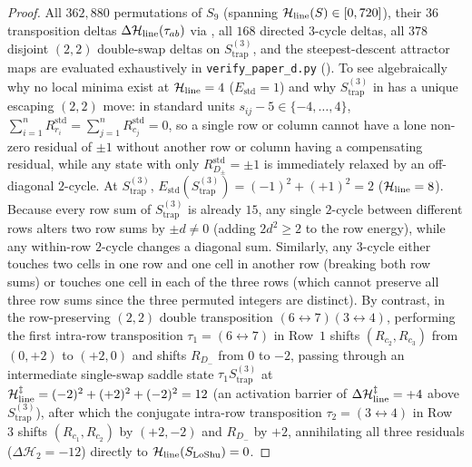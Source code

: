 \begin{proof}
All $362{,}880$ permutations of $S_9$ (spanning $\mathcal{H}_{\mathrm{line}}(S) \in [0, 720]$), their $36$ transposition deltas $\Delta\mathcal{H}_{\mathrm{line}}(\tau_{ab})$ via , all $168$ directed $3$-cycle deltas, all $378$ disjoint $(2,2)$ double-swap deltas on $S_{\mathrm{trap}}^{(3)}$, and the steepest-descent attractor maps are evaluated exhaustively in \texttt{verify\_paper\_d.py} (). To see algebraically why no local minima exist at $\mathcal{H}_{\mathrm{line}} = 4$ ($E_{\mathrm{std}} = 1$) and why $S_{\mathrm{trap}}^{(3)}$ in  has a unique escaping $(2,2)$ move: in standard units $s_{ij} - 5 \in \{-4,\dots,4\}$, $\sum_{i=1}^n R_{r_i}^{\mathrm{std}} = \sum_{j=1}^n R_{c_j}^{\mathrm{std}} = 0$, so a single row or column cannot have a lone non-zero residual of $\pm 1$ without another row or column having a compensating residual, while any state with only $R_{D_\pm}^{\mathrm{std}} = \pm 1$ is immediately relaxed by an off-diagonal $2$-cycle. At $S_{\mathrm{trap}}^{(3)}$, $E_{\mathrm{std}}(S_{\mathrm{trap}}^{(3)}) = (-1)^2 + (+1)^2 = 2$ ($\mathcal{H}_{\mathrm{line}} = 8$). Because every row sum of $S_{\mathrm{trap}}^{(3)}$ is already $15$, any single $2$-cycle between different rows alters two row sums by $\pm d \ne 0$ (adding $2d^2 \ge 2$ to the row energy), while any within-row $2$-cycle changes a diagonal sum. Similarly, any $3$-cycle either touches two cells in one row and one cell in another row (breaking both row sums) or touches one cell in each of the three rows (which cannot preserve all three row sums since the three permuted integers are distinct). By contrast, in the row-preserving $(2,2)$ double transposition $(6\leftrightarrow 7)(3\leftrightarrow 4)$, performing the first intra-row transposition $\tau_1 = (6\leftrightarrow 7)$ in Row~$1$ shifts $(R_{c_2}, R_{c_3})$ from $(0,+2)$ to $(+2,0)$ and shifts $R_{D_-}$ from $0$ to $-2$, passing through an intermediate single-swap saddle state $\tau_1 S_{\mathrm{trap}}^{(3)}$ at $\mathcal{H}_{\mathrm{line}}^\ddagger = (-2)^2 + (+2)^2 + (-2)^2 = 12$ (an activation barrier of $\Delta\mathcal{H}_{\mathrm{line}}^\ddagger = +4$ above $S_{\mathrm{trap}}^{(3)}$), after which the conjugate intra-row transposition $\tau_2 = (3\leftrightarrow 4)$ in Row~$3$ shifts $(R_{c_1}, R_{c_2})$ by $(+2,-2)$ and $R_{D_-}$ by $+2$, annihilating all three residuals ($\Delta\mathcal{H}_2 = -12$) directly to $\mathcal{H}_{\mathrm{line}}(S_{\mathrm{LoShu}}) = 0$.
\end{proof}

